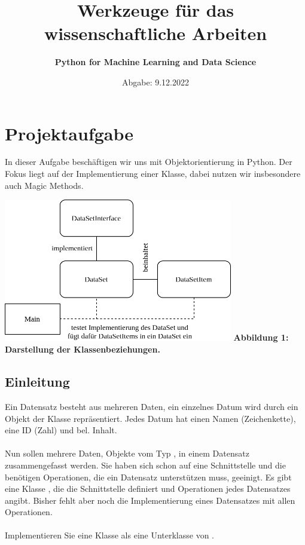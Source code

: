 \documentclass{article}
\begin{document}
	\title{\bf Werkzeuge für das wissenschaftliche Arbeiten}
	\author{\bf Python for Machine Learning and Data Science}
	\date{Abgabe: 9.12.2022}
	\maketitle
	
	\tableofcontents
	
	\section{Projektaufgabe}
		In dieser Aufgabe beschäftigen wir uns mit Objektorientierung in Python.
		Der Fokus liegt auf der Implementierung einer Klasse, dabei nutzen wir insbesondere auch Magic Methods.
		
		\hspace*{2cm}\includegraphics[width=10cm]{./../diagram/classes_files.png}
		\hspace*{3cm}\scriptsize\bf Abbildung 1: \normalfont Darstellung der Klassenbeziehungen.\normalsize

		\subsection{Einleitung}
			Ein Datensatz besteht aus mehreren Daten, ein einzelnes Datum wird durch ein Objekt der Klasse \grqq{} repräsentiert.
			Jedes Datum hat einen Namen (Zeichenkette), eine ID (Zahl) und bel. Inhalt.\\
			\\
			Nun sollen mehrere Daten, Objekte vom Typ \grqq{}, in einem Datensatz zusammengefasst werden.
			Sie haben sich schon auf eine Schnittstelle und die benötigen Operationen, die ein Datensatz unterstützen muss, geeinigt.
			Es gibt eine Klasse \grqq{}, die die Schnittstelle definiert und Operationen jedes Datensatzes angibt.
			Bisher fehlt aber noch die Implementierung eines Datensatzes mit allen Operationen.\\
			\\
			Implementieren Sie eine Klasse \grqq{} als eine Unterklasse von \grqq{}.\\
	
\end{document}
